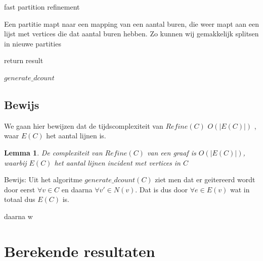 \documentclass[twoside]{article}
\newtheorem{lemma}[theorem]{Lemma}
\begin{document}
\begin{multicols}{2}
\begin{algorithm}[H]
{{{{}	



  }
 }
}

 \caption{fast partition refinement}
\end{algorithm}
\pagebreak

\begin{algorithm}[H]
Een partitie mapt naar een mapping van een aantal buren, die weer mapt aan een lijst met vertices die dat aantal buren hebben. Zo kunnen wij gemakkelijk splitsen in nieuwe partities \;


return result
 

\caption{$ generate\_dcount $}
\end{algorithm}




\subsection{Bewijs}

We gaan hier bewijzen dat de tijdscomplexiteit van  $ Refine(C) $ $ O(|E(C)|)$ ,  waar $ E(C) $ het aantal lijnen is.

\begin{lemma}
De complexiteit van $Refine(C)$ van een graaf is $O(|E(C)|) $,  waarbij  $ E(C)$ het aantal lijnen incident met vertices in $C$
\end{lemma}

Bewijs:
Uit het algoritme $ generate\_dcount(C) $ ziet men dat er geitereerd wordt door eerst $ \forall v \in C $ en daarna $  \forall v' \in N(v) $. Dat is dus door $\forall e \in E(v) $ wat in totaal dus $ E(C) $ is. 

daarna w

\section{Berekende resultaten}


\end{multicols}
\end{document}
